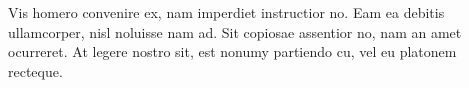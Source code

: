 \documentclass[a4paper,10pt]{article}
\begin{document}
Vis homero convenire ex, nam imperdiet instructior no. Eam ea debitis ullamcorper, nisl noluisse nam ad. Sit copiosae assentior no, nam an amet ocurreret. At legere nostro sit, est nonumy partiendo cu, vel eu platonem recteque.

{}


{\small \trollface}
\end{document}
